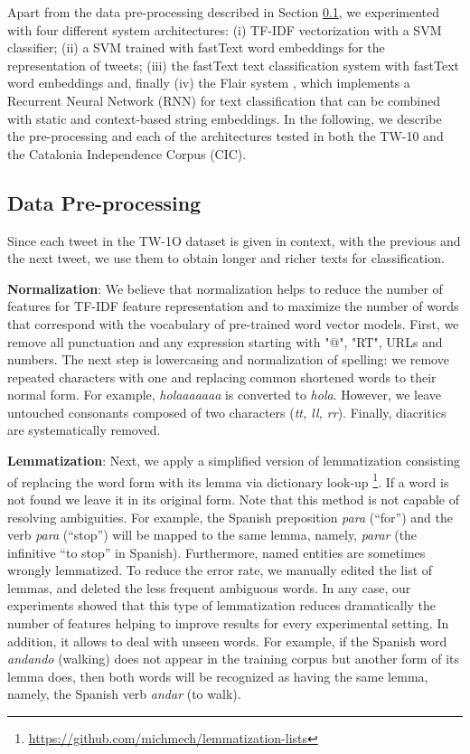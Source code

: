 \documentclass[10pt, a4paper]{article}
\begin{document}
Apart from the data pre-processing described in Section \ref{sec:data-pre-processing}, we experimented with four different system architectures: (i) TF-IDF vectorization with a SVM classifier; (ii) a SVM trained with fastText word embeddings \cite{Grave18} for the representation of tweets; (iii) the fastText text classification system \cite{joulin-etal-2017-bag} with fastText word embeddings and, finally (iv) the Flair system \cite{akbik-etal-2018-contextual}, which implements a Recurrent Neural Network (RNN) for text classification that can be combined with static and context-based string embeddings. In the following, we describe the pre-processing and each of the architectures tested in both the TW-10 and the Catalonia Independence Corpus (CIC).

\subsection{Data Pre-processing}\label{sec:data-pre-processing}

Since each tweet in the TW-1O dataset is given in context, with the previous and the next tweet, we use them to obtain longer and richer texts for classification.

\textbf{Normalization}: We believe that normalization helps to reduce the number of features for TF-IDF feature representation and to maximize the number of words that correspond with the vocabulary of pre-trained word vector models. First, we remove all punctuation and any expression starting with "@", "RT", URLs and numbers. The next step is lowercasing and normalization of spelling: we remove repeated characters with one and replacing common shortened words to their normal form. For example, \textit{holaaaaaaa} is converted to \textit{hola}. However, we leave untouched consonants composed of two characters (\emph{tt, ll, rr}). Finally, diacritics are systematically removed.

\textbf{Lemmatization}: Next, we apply a simplified version of lemmatization consisting of replacing the word form with its lemma via dictionary look-up \footnote{\url{https://github.com/michmech/lemmatization-lists}}. If a word is not found we leave it in its original form. Note that this method is not capable of resolving ambiguities. For example, the Spanish preposition \textit{para} (``for'') and the verb \textit{para} (``stop'') will be mapped to the same lemma, namely, \textit{parar} (the infinitive ``to stop'' in Spanish). Furthermore, named entities are sometimes wrongly lemmatized. To reduce the error rate, we manually edited the list of lemmas, and deleted the less frequent ambiguous words. In any case, our experiments showed that this type of lemmatization reduces dramatically the number of features helping to improve results for every experimental setting. In addition, it allows to deal with unseen words. For example, if the Spanish word \textit{andando} (walking) does not appear in the training corpus but another form of its lemma does, then both words will be recognized as having the same lemma, namely, the Spanish verb \textit{andar} (to walk).
\end{document}
